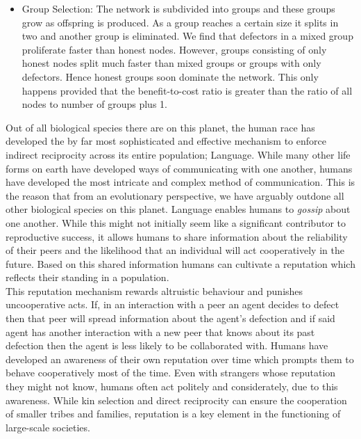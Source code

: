 \begin{itemize}
\item Group Selection: The network is subdivided into groups and these groups grow as offspring is produced. As a group reaches a certain size  it splits in two and another group is eliminated. We find that defectors in a mixed group proliferate faster than honest nodes. However, groups consisting of only honest nodes split much faster than mixed groups or groups with only defectors. Hence honest groups soon dominate the network. This only happens provided that the benefit-to-cost ratio is greater than the ratio of all nodes to number of groups plus 1. \vspace{1em}\\
\end{itemize}

\noindent{}Out of all biological species there are on this planet, the human race has developed the by far most sophisticated and effective mechanism to enforce indirect reciprocity across its entire population; Language. While many other life forms on earth have developed ways of communicating with one another, humans have developed the most intricate and complex method of communication. This is the reason that from an evolutionary perspective, we have arguably outdone all other biological species on this planet. Language enables humans to {\it gossip} about one another. While this might not initially seem like a significant contributor to reproductive success, it allows humans to share information about the reliability of their peers and the likelihood that an individual will act cooperatively in the future. Based on this shared information humans can cultivate a reputation which reflects their standing in a population.  \vspace{1em}\\

\noindent{}This reputation mechanism rewards altruistic behaviour and punishes uncooperative acts. If, in an interaction with a peer an agent decides to defect then that peer will spread information about the agent's defection and if said agent has another interaction with a new peer that knows about its past defection then the agent is less likely to be collaborated with. Humans have developed an awareness of their own reputation over time which prompts them to behave cooperatively most of the time. Even with strangers whose reputation they might not know, humans often act politely and considerately, due to this awareness. While kin selection and direct reciprocity can ensure the cooperation of smaller tribes and families, reputation is a key element in the functioning of large-scale societies. \vspace{1em}\\

